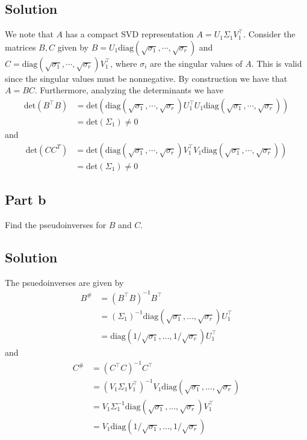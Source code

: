\documentclass[a4paper]{article}
\begin{document}
\subsection*{Solution}%
We note that $A$ has a compact SVD representation $A = U_1 \Sigma_1 V_1^\top$. Consider the matrices $B,C$ given by
$B = U_1 \text{diag}(\sqrt{\sigma_1}, \cdots, \sqrt{\sigma_r})$ and $C = \text{diag}(\sqrt{\sigma_1}, \cdots, \sqrt{\sigma_r})V_1^\top$, where $\sigma_i$ are the singular values of $A$. This is valid since the singular values must be nonnegative. By construction we have that $A = BC$. Furthermore, analyzing the determinants we have
\[
  \begin{aligned}
    \text{det}(B^\top B) &= \text{det}(\text{diag}(\sqrt{\sigma_1}, \cdots, \sqrt{\sigma_r})U_1^\top U_1 \text{diag}(\sqrt{\sigma_1}, \cdots, \sqrt{\sigma_r}))\\
                         &= \text{det}(\Sigma_1) \neq 0
  \end{aligned}
\]
and
\[
  \begin{aligned}
    \text{det}(CC^T) &= \text{det}(\text{diag}(\sqrt{\sigma_1}, \cdots, \sqrt{\sigma_r})V_1^\top V_1 \text{diag}(\sqrt{\sigma_1}, \cdots, \sqrt{\sigma_r})) \\
                   &= \text{det}(\Sigma_1) \neq 0
  \end{aligned}
\]


\subsection*{Part b}%
Find the pseudoinverses for $B$ and $C$.

\subsection*{Solution}%
The psuedoinverses are given by
\[
  \begin{aligned}
    B^\# &= (B^\top B)^{-1}B^\top  \\
         &= (\Sigma_1)^{-1}\text{diag}(\sqrt{\sigma_1}, \dots, \sqrt{\sigma_r})U_1^\top \\
         &= \text{diag}(1/\sqrt{\sigma_1}, \dots, 1/\sqrt{\sigma_r})U_1^\top
  \end{aligned}
\]
and
\[
  \begin{aligned}
    C^\# &= (C^\top C)^{-1}C^\top \\
         &= (V_1 \Sigma_1 V_1^\top)^{-1}V_1 \text{diag}(\sqrt{\sigma_1}, \dots, \sqrt{\sigma_r})\\
         &= V_1 \Sigma_1^{-1}\text{diag}(\sqrt{\sigma_1}, \dots, \sqrt{\sigma_r})V_1^\top \\
         &= V_1 \text{diag}(1/\sqrt{\sigma_1}, \dots, 1/\sqrt{\sigma_r})
  \end{aligned}
\]
\end{document}
